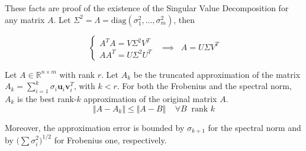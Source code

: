 \documentclass{article}
\numberwithin{equation}{subsection}
\begin{document}
These facts are proof of the existence of the Singular Value Decomposition for any matrix $A$. Let $\Sigma^2 = \Lambda = \text{diag}(\sigma_1^2,...,\sigma_m^2)$, then

\begin{equation}
    \begin{cases}
        A^T A = V \Sigma^2 V^T \\
        A A^T = U \Sigma^2 U^T 
    \end{cases}
    \;\; \implies \;\; A = U \Sigma V^T
\end{equation}

\begin{theorem}
    Let $A \in \mathbb{R}^{n \times m}$ with rank $r$. Let $A_k$ be the truncated approximation of the matrix $A_k = \sum_{i=1}^k \sigma_i \textbf{u}_i \textbf{v}_i^T$, with $k < r$. For both the Frobenius and the spectral norm, $A_k$ is the best rank-$k$ approximation of the original matrix $A$.
    \begin{equation*}
        \Vert A - A_k \Vert \leq \Vert A - B \Vert \;\;\;\; \forall B \;\; \text{rank }k
    \end{equation*}

    Moreover, the approximation error is bounded by $\sigma_{k+1}$ for the spectral norm and by $\big(\sum \sigma_i^2)^{1/2}$ for Frobenius one, respectively.
\end{theorem}
\end{document}
